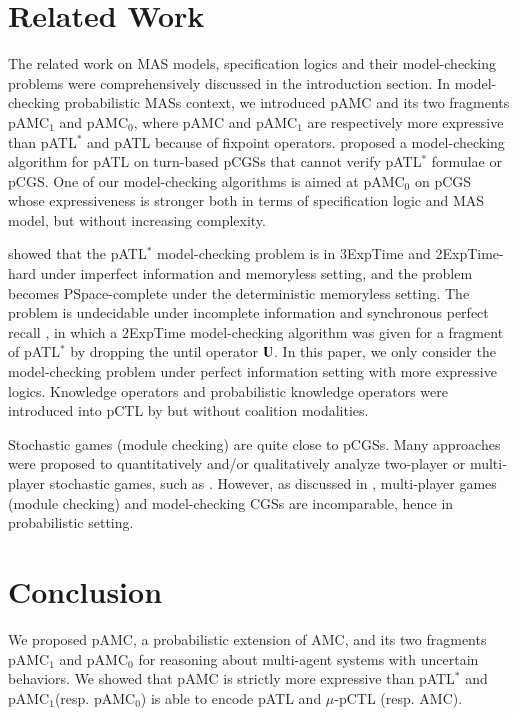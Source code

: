 \documentclass[letterpaper]{article}
\newcommand{\pamc}{{pAMC}\xspace}
\newcommand{\pamcs}{{pAMC$_0$}\xspace}
\newcommand{\pamcc}{{pAMC$_1$}\xspace}
\newcommand{\opU}{{\bf U}}
\begin{document}
\section{Related Work}
\label{sec:related}
The related work on MAS models, specification logics and their model-checking problems were comprehensively discussed in the introduction section.
In model-checking probabilistic MASs context, we introduced \pamc and its two fragments \pamcc and \pamcs, where \pamc and \pamcc are respectively more expressive than
pATL$^*$ and pATL \cite{CL07a} because of fixpoint operators.
\cite{CL07a} proposed a model-checking algorithm for pATL on turn-based pCGSs that cannot verify pATL$^*$ formulae or pCGS.
One of our model-checking algorithms is aimed at \pamcs on pCGS whose expressiveness is stronger both in terms of specification logic and MAS model, but without increasing complexity.

\cite{Sch10} showed that the pATL$^*$ model-checking problem is in {\sc 3ExpTime} and {\sc 2ExpTime}-hard under imperfect information and memoryless setting, and the problem becomes {\sc PSpace}-complete under the deterministic
memoryless setting.  The problem is undecidable under incomplete information and synchronous perfect recall \cite{HSZ12}, in which a {\sc 2ExpTime} model-checking algorithm was given for a fragment of pATL$^*$ by dropping the until operator $\opU$. In this paper, we only consider the model-checking problem under perfect information setting with more expressive logics.
Knowledge operators and probabilistic knowledge operators were introduced into pCTL by \cite{WBYH16,WBH13} but without coalition modalities.

Stochastic games (module checking) are quite close to pCGSs. Many approaches were proposed to quantitatively and/or qualitatively analyze two-player or multi-player stochastic games, such as \cite{CJH04,AM04,CHH09,CH12,CH13}. However, as discussed in \cite{JM14}, multi-player games (module checking) and model-checking CGSs are incomparable, hence in probabilistic setting.


\section{Conclusion}
We proposed \pamc, a probabilistic extension of AMC, and
its two fragments \pamcc and \pamcs for reasoning about multi-agent systems with uncertain behaviors.
We showed that \pamc is strictly more expressive than pATL$^*$ and \pamcc (resp. \pamcs) is able to encode pATL and $\mu$-pCTL (resp. AMC).
\end{document}
